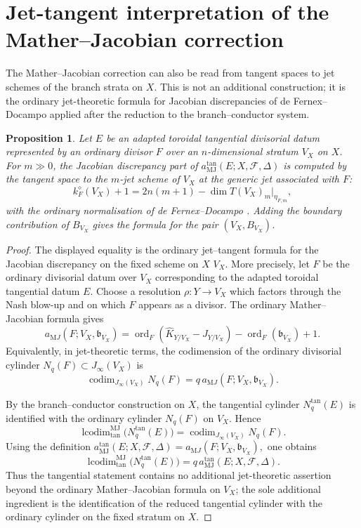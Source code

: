 \documentclass[11pt]{amsart}
\numberwithin{equation}{section}
\theoremstyle{plain}
\newtheorem{Proposition}[Theorem]{Proposition}
\theoremstyle{definition}
\newcommand{\codim}{\operatorname{codim}}
\newcommand{\ord}{\operatorname{ord}}
\newcommand{\lcodim}{\operatorname{lcodim}}
\newcommand{\MJ}{\mathrm{MJ}}
\newcommand{\bbound}{\mathfrak b}
\newcommand{\cF}{\mathcal F}
\begin{document}
\section{Jet-tangent interpretation of the Mather--Jacobian correction}
\label{sec:jet-tangent-mj}

The Mather--Jacobian correction can also be read from tangent spaces to jet schemes of the branch strata on $X$.  This is not an additional construction; it is the ordinary jet-theoretic formula for Jacobian discrepancies of de Fernex--Docampo \cite{dFD} applied after the reduction to the branch--conductor system.

\begin{Proposition}
\label{prop:jet-tangent}
Let $E$ be an adapted toroidal tangential divisorial datum represented by an ordinary divisor $F$ over an $n$-dimensional stratum $V_X$ on $X$.  For $m\gg0$, the Jacobian discrepancy part of $a^{\tan}_{\MJ}(E;X,\cF,\Delta)$ is computed by the tangent space to the $m$-jet scheme of $V_X$ at the generic jet associated with $F$:
\[
k_F^{\diamond}(V_X)+1
=
2n(m+1)-\dim T(V_X)_m|_{\eta_{F,m}},
\]
with the ordinary normalisation of de Fernex--Docampo \cite{dFD}.  Adding the boundary contribution of $B_{V_X}$ gives the formula for the pair $(V_X,B_{V_X})$.
\end{Proposition}

\begin{proof}
The displayed equality is the ordinary jet--tangent formula for the Jacobian discrepancy on the fixed scheme on $X$ \(V_X\). More precisely, let \(F\) be the ordinary divisorial datum over \(V_X\) corresponding to the adapted toroidal tangential datum \(E\). Choose a resolution
$
\rho:Y\longrightarrow V_X
$
which factors through the Nash blow-up and on which \(F\) appears as a divisor. The ordinary Mather--Jacobian formula gives
\[
a_{\mathrm MJ}(F;V_X,\bbound_{V_X})
=
\ord_F(\widehat K_{Y/V_X}-J_{Y/V_X})
-
\ord_F(\bbound_{V_X})
+
1.
\]
Equivalently, in jet-theoretic terms, the codimension of the ordinary divisorial cylinder \(N_q(F)\subset J_\infty(V_X)\) is
\[
\codim_{J_\infty(V_X)}N_q(F)
=
q\,a_{\mathrm MJ}(F;V_X,\bbound_{V_X}).
\]

By the branch--conductor construction on $X$, the tangential cylinder \(N_q^{\tan}(E)\) is identified with the ordinary cylinder \(N_q(F)\) on \(V_X\). Hence
\[
\lcodim^{\MJ}_{\tan}\bigl(N_q^{\tan}(E)\bigr)
=
\codim_{J_\infty(V_X)}N_q(F).
\]
Using the definition
$
a^{\tan}_{\MJ}(E;X,\cF,\Delta)
=
a_{\mathrm MJ}(F;V_X,\bbound_{V_X}),
$
one obtains
\[
\lcodim^{\MJ}_{\tan}\bigl(N_q^{\tan}(E)\bigr)
=
q\,a^{\tan}_{\MJ}(E;X,\cF,\Delta).
\]
Thus the tangential statement contains no additional jet-theoretic assertion beyond the ordinary Mather--Jacobian formula on \(V_X\); the sole additional ingredient is the identification of the reduced tangential cylinder with the ordinary cylinder on the fixed stratum on $X$.
\end{proof}
\end{document}

